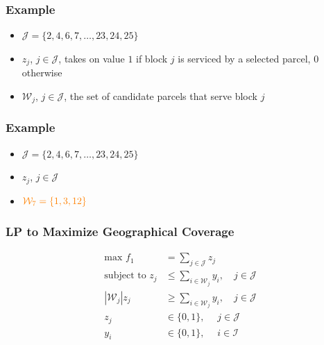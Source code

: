 \documentclass[10pt, compress]{beamer}
\begin{document}
\begin{frame}[fragile]
  \frametitle{Example}
  \begin{center}
\end{center}
\begin{itemize}
\item $\mathcal{J} = \{2,4,6,7, \dots, 23,24,25\}$
\item $z_j$, \; $j \in \mathcal{J}$, takes on value $1$ if block $j$ is serviced by a selected parcel, 0 otherwise
\item $\mathcal{W}_j$, \; $j \in \mathcal{J}$,  the set of candidate parcels that serve block $j$
\end{itemize}
\end{frame}

\begin{frame}[fragile]
  \frametitle{Example}
  \begin{center}
\end{center}
\begin{itemize}
\item $\mathcal{J} = \{2,4,6,7, \dots, 23,24,25\}$
\item $z_j$, \; $j \in \mathcal{J}$
\item $\color{orange}\mathcal{W}_7 = \{1,3,12\}$
\end{itemize}
\end{frame}

\begin{frame}[fragile]
\frametitle{LP to Maximize Geographical Coverage}
\noindent{}
\begin{align*}
\textrm{max } f_1 &= \sum_{j \in \mathcal{J}} z_j \\
\textrm{subject to } z_j &\leq \sum_{i \in \mathcal{W}_j} y_i, \quad j \in \mathcal{J}\\
\left|\mathcal{W}_j\right|z_j &\geq \sum_{i \in \mathcal{W}_j} y_i, \quad j \in \mathcal{J} \\
z_j &\in \{0,1\}, \quad \; j \in \mathcal{J} \\
y_i &\in \{0,1\}, \quad \; i \in \mathcal{I}
\end{align*}
\end{frame}
\end{document}
